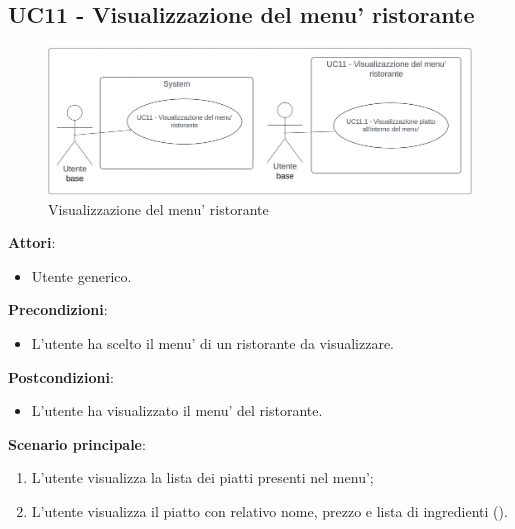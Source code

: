 \subsection{UC11 - Visualizzazione del menu' ristorante} \label{usecase:11}
\begin{figure}[H]
    \centering
    \includegraphics[width=0.9\linewidth]{ucd/UCD11_new.png}
\caption{Visualizzazione del menu' ristorante}
\end{figure}
\textbf{Attori}:
\begin{itemize}
    \item Utente generico.
\end{itemize}
\textbf{Precondizioni}:
\begin{itemize}
    \item L'utente ha scelto il menu' di un ristorante da visualizzare.
\end{itemize}
\textbf{Postcondizioni}:
\begin{itemize}
    \item L'utente ha visualizzato il menu' del ristorante.
\end{itemize}
\textbf{Scenario principale}:
\begin{enumerate}
    \item L'utente visualizza la lista dei piatti presenti nel menu';
    \item L’utente visualizza il piatto con relativo nome, prezzo e lista di ingredienti ().
\end{enumerate}

